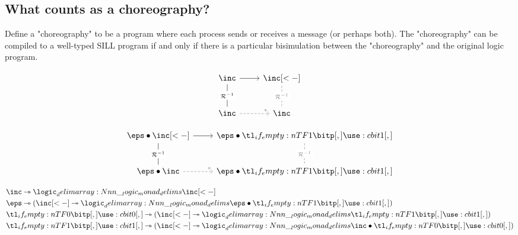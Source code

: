 





\subsection{What counts as a choreography?}\label{sec:what-counts-choreo}

\begin{claim*}
  Define a "choreography" to be a program where each process sends or receives a message (or perhaps both).
  The "choreography" can be compiled to a well-typed SILL program if and only if there is a particular bisimulation between the "choreography" and the original logic program.
\end{claim*}






\begin{equation*}
  \begin{tikzcd}[row sep = 6ex]
    \inc \rar \dar[dash][description]{\mathcal{R}^{-1}}
      & \inc[<-] \dar[gray,dash,dashed][description]{\mathcal{R}^{-1}}
    \\
    \inc \rar[gray,dashed][very near end]{*} & \inc
  \end{tikzcd}
\end{equation*}

\begin{equation*}
  \begin{tikzcd}[row sep = 6ex]
    \eps \fuse \inc[<-] \rar \dar[dash][description]{\mathcal{R}^{-1}}
      & \eps \fuse \bit{1} \dar[gray,dash,dashed][description]{\mathcal{R}^{-1}}
    \\
    \eps \fuse \inc \rar[gray,dashed][very near end]{*} & \eps \fuse \bit{1}
  \end{tikzcd}
\end{equation*}



\begin{align*}
  &\inc \lrimp \monad{\inc[<-]} \\
  &\eps \lrimp (\inc[<-] \rimp \monad{\eps \fuse \bit{1}}) \\
  &\bit{0} \lrimp (\inc[<-] \rimp \monad{\bit{1}}) \\
  &\bit{1} \lrimp (\inc[<-] \rimp \monad{\inc \fuse \bit{0}})
\end{align*}

